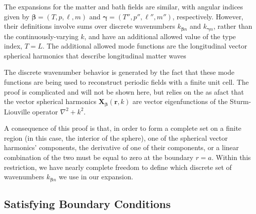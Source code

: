 \documentclass{article}
\begin{document}
The expansions for the matter and bath fields are similar, with angular indices given by $\bm{\beta} = (T,p,\ell,m)$ and $\bm{\gamma} = (T'',p'',\ell'',m'')$, respectively. However, their definitions involve sums over discrete wavenumbers $k_{\bm{\beta}n}$ and $k_{\bm{\gamma}n}$, rather than the continuously-varying $k$, and have an additional allowed value of the type index, $T = L$. The additional allowed mode functions are the longitudinal vector spherical harmonics that describe longitudinal matter waves

The discrete wavenumber behavior is generated by the fact that these mode functions are being used to reconstruct periodic fields with a finite unit cell. The proof is complicated\cite{titchmarsh1946eigenfunction} and will not be shown here, but relies on the as afact that the vector spherical harmonics $\mathbf{X}_{\bm{\beta}}(\mathbf{r},k)$ are vector eigenfunctions of the Sturm-Liouville operator $\nabla^2 + k^2$. 

A consequence of this proof is that, in order to form a complete set on a finite region (in this case, the interior of the sphere), one of the spherical vector harmonics' components, the derivative of one of their components, or a linear combination of the two must be equal to zero at the boundary $r = a$. Within this restriction, we have nearly complete freedom to define which discrete set of wavenumbers $k_{\bm{\beta}n}$ we use in our expansion.






\subsection{Satisfying Boundary Conditions}
\end{document}
